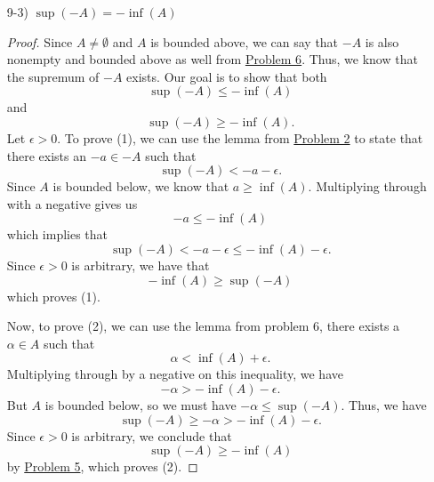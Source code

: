 \documentclass[11pt,a4paper]{article}
\begin{document}
\begin{enumerate}
\begin{enumerate}
\begin{proof}
            To prove (2), let \( \epsilon > 0 \) again. Since \( \sup(A) \) and \( \sup(B) \) exists, we see that there exists \( \alpha \in A  \) and \( \beta \in B  \) such that 
        \[  \alpha > \sup(A) - \frac{ \epsilon }{ 2 }   \]
        and 
        \[  \beta > \sup(B) - \frac{ \epsilon  }{ 2 }  \]
        by the lemma found in {\hyperref[Problem 2]{Problem 2}}. Adding these two inequalities results in 
        \[  \alpha + \beta > \sup(A) + \sup(B) - \epsilon. \]
        Note that \( \alpha + \beta \in A + B  \) and \( A + B  \) is bounded above, we have that
        \[  \sup(A+B) \geq \alpha + \beta > \sup(A) + \sup(B) - \epsilon. \]
        Since \( \epsilon > 0  \) is arbitrary, we can see that
        \[  \sup(A+B) \geq \sup(A) + \sup(B) \]
        by {\hyperref[Problem 5]{Problem 5}}. Since (1) and (2) are satisfied, we can conclude that
        \[  \sup(A+B) = \sup(A) + \sup(B). \]
            \end{proof}
        \item[9-3)] \( \sup(-A) = - \inf(A) \) 
            \begin{proof}
            Since \( A \neq \emptyset  \) and \(A  \) is bounded above, we can say that \( -A  \) is also nonempty and bounded above as well from {\hyperref[Problem 6]{Problem 6}}. Thus, we know that the supremum of \( -A  \) exists. Our goal is to show that both
            \[  \sup(-A) \leq - \inf(A) \tag{1} \]
            and
            \[  \sup(-A) \geq - \inf(A) \tag{2}. \]
            Let \( \epsilon > 0  \). To prove (1), we can use the lemma from {\hyperref[Problem 2]{Problem 2}} to state that there exists an \( -a \in -A  \) such that 
            \[  \sup(-A) <  - a - \epsilon. \]
            Since \( A  \) is bounded below, we know that \( a \geq \inf(A)  \). Multiplying through with a negative gives us 
            \[  - a \leq - \inf(A) \]
            which implies that 
            \[  \sup(-A) <  - a - \epsilon \leq - \inf(A) - \epsilon. \]
            Since \( \epsilon > 0 \) is arbitrary, we have that
            \[  - \inf(A) \geq \sup(-A) \]
            which proves (1). 

            Now, to prove (2), we can use the lemma from problem 6, there exists             a \( \alpha \in A  \) such that  
            \[  \alpha < \inf(A) + \epsilon. \]
            Multiplying through by a negative on this inequality, we have 
            \[  - \alpha > - \inf(A) - \epsilon. \]
            But \( A  \) is bounded below, so we must have \( - \alpha \leq \sup(-A) \). Thus, we have
            \[  \sup(-A) \geq - \alpha > - \inf(A) - \epsilon. \]
            Since \( \epsilon > 0  \) is arbitrary, we conclude that 
            \[  \sup(-A) \geq - \inf(A) \]
            by {\hyperref[Problem 5]{Problem 5}}, which proves (2).
 

\end{proof}
\end{enumerate}
\end{enumerate}
\end{document}
